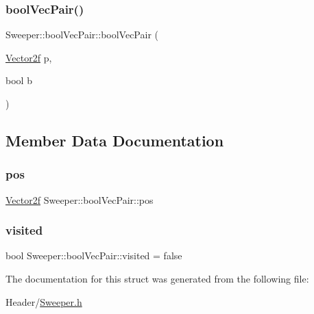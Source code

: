 \mbox{\label{struct_sweeper_1_1bool_vec_pair_a8e9d3b719a0671275d8413144df07249}} 
\subsubsection{\texorpdfstring{boolVecPair()}{boolVecPair()}\hspace{0.1cm}{\footnotesize\ttfamily [2/2]}}
{\footnotesize\ttfamily Sweeper\+::bool\+Vec\+Pair\+::bool\+Vec\+Pair (\begin{DoxyParamCaption}\item[{\mbox{\hyperlink{class_vector2f}{Vector2f}}}]{p,  }\item[{bool}]{b }\end{DoxyParamCaption})\hspace{0.3cm}{\ttfamily [inline]}}



\subsection{Member Data Documentation}
\mbox{\label{struct_sweeper_1_1bool_vec_pair_a8234a943d954b313a5f5fdf30cd65d29}} 
\subsubsection{\texorpdfstring{pos}{pos}}
{\footnotesize\ttfamily \mbox{\hyperlink{class_vector2f}{Vector2f}} Sweeper\+::bool\+Vec\+Pair\+::pos}

\mbox{\label{struct_sweeper_1_1bool_vec_pair_a9ef5a79d1980954fe48dfc41e6c8a68f}} 
\subsubsection{\texorpdfstring{visited}{visited}}
{\footnotesize\ttfamily bool Sweeper\+::bool\+Vec\+Pair\+::visited = false}



The documentation for this struct was generated from the following file\+:\begin{DoxyCompactItemize}
\item 
Header/\mbox{\hyperlink{_sweeper_8h}{Sweeper.\+h}}\end{DoxyCompactItemize}
